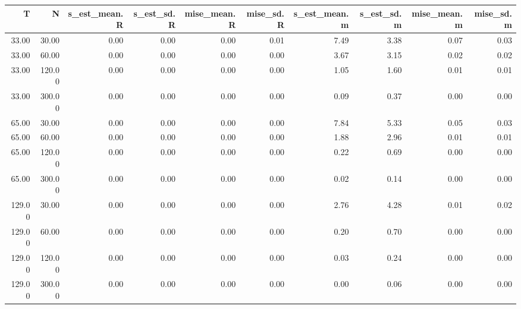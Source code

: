 \begin{table}[ht]
\centering
\begin{tabular}{rrrrrrrrrr}
  \hline
T & N & s\_est\_mean.R & s\_est\_sd.R & mise\_mean.R & mise\_sd.R & s\_est\_mean.m & s\_est\_sd.m & mise\_mean.m & mise\_sd.m \\ 
  \hline
33.00 & 30.00 & 0.00 & 0.00 & 0.00 & 0.01 & 7.49 & 3.38 & 0.07 & 0.03 \\ 
  33.00 & 60.00 & 0.00 & 0.00 & 0.00 & 0.00 & 3.67 & 3.15 & 0.02 & 0.02 \\ 
  33.00 & 120.00 & 0.00 & 0.00 & 0.00 & 0.00 & 1.05 & 1.60 & 0.01 & 0.01 \\ 
  33.00 & 300.00 & 0.00 & 0.00 & 0.00 & 0.00 & 0.09 & 0.37 & 0.00 & 0.00 \\ 
  65.00 & 30.00 & 0.00 & 0.00 & 0.00 & 0.00 & 7.84 & 5.33 & 0.05 & 0.03 \\ 
  65.00 & 60.00 & 0.00 & 0.00 & 0.00 & 0.00 & 1.88 & 2.96 & 0.01 & 0.01 \\ 
  65.00 & 120.00 & 0.00 & 0.00 & 0.00 & 0.00 & 0.22 & 0.69 & 0.00 & 0.00 \\ 
  65.00 & 300.00 & 0.00 & 0.00 & 0.00 & 0.00 & 0.02 & 0.14 & 0.00 & 0.00 \\ 
  129.00 & 30.00 & 0.00 & 0.00 & 0.00 & 0.00 & 2.76 & 4.28 & 0.01 & 0.02 \\ 
  129.00 & 60.00 & 0.00 & 0.00 & 0.00 & 0.00 & 0.20 & 0.70 & 0.00 & 0.00 \\ 
  129.00 & 120.00 & 0.00 & 0.00 & 0.00 & 0.00 & 0.03 & 0.24 & 0.00 & 0.00 \\ 
  129.00 & 300.00 & 0.00 & 0.00 & 0.00 & 0.00 & 0.00 & 0.06 & 0.00 & 0.00 \\ 
   \hline
\end{tabular}
\end{table}
